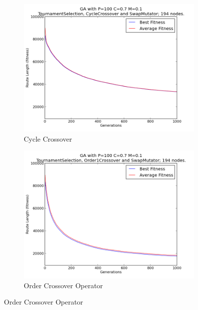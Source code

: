 \documentclass[10pt, a4paper]{article}
\begin{document}
\begin{figure}[h]
\centering
\begin{subfigure}[b]{0.67\textwidth}
\includegraphics[width=\textwidth]{img/results/cyclecrossover/swapmutator/n194p100c07m01}
\caption{Cycle Crossover}
\end{subfigure}

\begin{subfigure}[b]{0.67\textwidth}
\includegraphics[width=\textwidth]{img/results/order1crossover/swapmutator/n194p100c07m01}
\caption{Order Crossover Operator}
\end{subfigure}


\end{figure}
\end{document}

